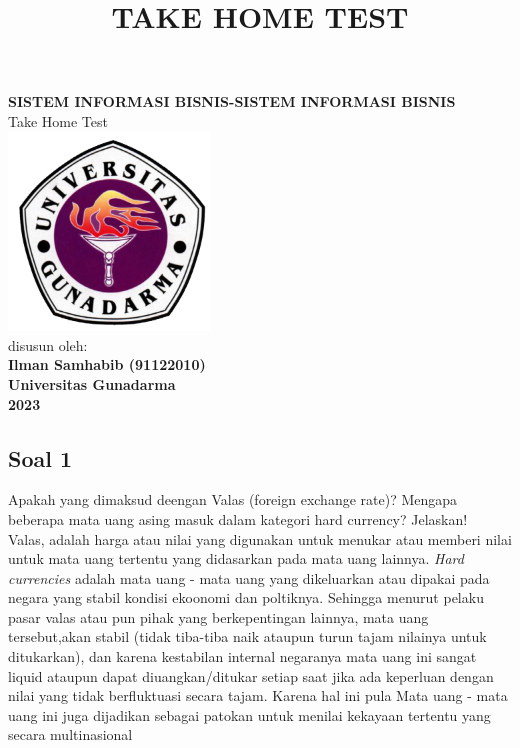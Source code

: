 \documentclass[12pt]{article}
\title{TAKE HOME TEST }
\begin{document}
\thispagestyle{empty}
\begin{center}
    \textbf{SISTEM INFORMASI BISNIS-SISTEM INFORMASI BISNIS }\\
    Take Home Test\\
    \vspace*{11\baselineskip}
    \includegraphics[width=0.4\textwidth,height=0.4\textwidth]{glogo}  \\
    \vspace*{11\baselineskip}
    disusun oleh:\\
    \textbf{Ilman Samhabib (91122010)}\\
    \textbf{Universitas Gunadarma}\\
    \textbf{2023}\\
\end{center}
\newpage


\subsection*{Soal 1}
\noindent


Apakah yang dimaksud deengan Valas (foreign exchange rate)? Mengapa beberapa mata uang asing masuk dalam kategori hard currency? Jelaskan!\\

Valas, adalah harga atau nilai yang digunakan untuk menukar atau memberi nilai untuk mata uang tertentu yang didasarkan pada mata uang lainnya. \emph{Hard currencies} adalah mata uang - mata uang yang dikeluarkan atau dipakai pada negara yang stabil kondisi ekoonomi dan poltiknya. Sehingga menurut pelaku pasar valas atau pun pihak yang berkepentingan lainnya, mata uang tersebut,akan stabil (tidak tiba-tiba naik ataupun turun tajam nilainya untuk ditukarkan), dan karena kestabilan internal negaranya mata uang ini sangat liquid ataupun dapat diuangkan/ditukar setiap saat jika ada keperluan dengan nilai yang tidak berfluktuasi secara tajam. Karena hal ini pula Mata uang - mata uang ini juga dijadikan sebagai patokan untuk menilai kekayaan tertentu yang secara multinasional \autocite{onlineshayla2022}
\end{document}

